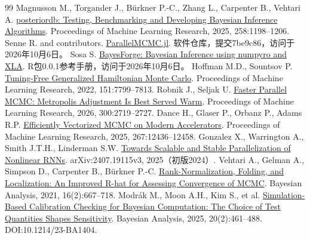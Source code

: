 \begin{thebibliography}{99}
 Magnusson M., Torgander J., Bürkner P.-C., Zhang L., Carpenter B., Vehtari A. \href{https://proceedings.mlr.press/v258/magnusson25a.html}{posteriordb: Testing, Benchmarking and Developing Bayesian Inference Algorithms}. Proceedings of Machine Learning Research, 2025, 258:1198--1206.
 Senne R. and contributors. \href{https://github.com/rsenne/ParallelMCMC.jl/tree/7be9c866c8be03ad994a5e7f0486ec3290088813}{ParallelMCMC.jl}. 软件仓库，提交7be9c86，访问于2026年10月6日。
 Sosa S. \href{https://cran.r-universe.dev/BayesForge/doc/manual.html}{BayesForge: Bayesian Inference using numpyro and XLA}. R包0.0.1参考手册，访问于2026年10月6日。
 Hoffman M.D., Sountsov P. \href{https://proceedings.mlr.press/v151/hoffman22a.html}{Tuning-Free Generalized Hamiltonian Monte Carlo}. Proceedings of Machine Learning Research, 2022, 151:7799--7813.
 Robnik J., Seljak U. \href{https://proceedings.mlr.press/v300/robnik26a.html}{Faster Parallel MCMC: Metropolis Adjustment Is Best Served Warm}. Proceedings of Machine Learning Research, 2026, 300:2719--2727.
 Dance H., Glaser P., Orbanz P., Adams R.P. \href{https://proceedings.mlr.press/v267/dance25a.html}{Efficiently Vectorized MCMC on Modern Accelerators}. Proceedings of Machine Learning Research, 2025, 267:12436--12458.
 Gonzalez X., Warrington A., Smith J.T.H., Linderman S.W. \href{https://arxiv.org/abs/2407.19115v3}{Towards Scalable and Stable Parallelization of Nonlinear RNNs}. arXiv:2407.19115v3, 2025（初版2024）.
 Vehtari A., Gelman A., Simpson D., Carpenter B., Bürkner P.-C. \href{https://doi.org/10.1214/20-BA1221}{Rank-Normalization, Folding, and Localization: An Improved R-hat for Assessing Convergence of MCMC}. Bayesian Analysis, 2021, 16(2):667--718.
 Modrák M., Moon A.H., Kim S., et al. \href{https://doi.org/10.1214/23-BA1404}{Simulation-Based Calibration Checking for Bayesian Computation: The Choice of Test Quantities Shapes Sensitivity}. Bayesian Analysis, 2025, 20(2):461--488. DOI:10.1214/23-BA1404.
\end{thebibliography}
